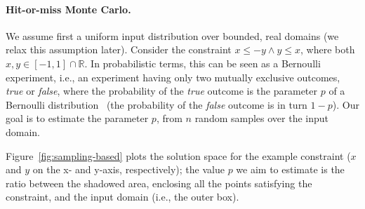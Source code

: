 \paragraph{Hit-or-miss Monte Carlo.}
We assume first a uniform input distribution over bounded, real domains (we relax this assumption later). Consider the constraint $x \leq -y \land y \leq x$, where both $x, y \in [-1, 1] \cap \mathbb{R}$. In probabilistic terms, this can be seen as a Bernoulli experiment, i.e., an experiment having only two mutually exclusive outcomes, \textit{true} or \textit{false}, where the probability of the \textit{true} outcome is the parameter $p$ of a Bernoulli distribution~\cite{pestman1998mathematical} (the probability of the \textit{false} outcome is in turn $1-p$). Our goal is to estimate the parameter $p$, from $n$ random samples over the input domain.

Figure~\ref{fig:sampling-based} plots the solution space for the example constraint ($x$ and $y$ on the x- and y-axis, respectively); the value $p$ we aim to estimate is the ratio between the shadowed area, enclosing all the points satisfying the constraint, and the input domain (i.e., the outer box).

